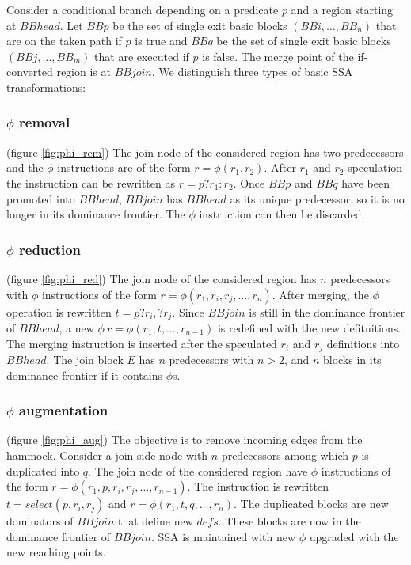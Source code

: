 Consider a conditional branch depending on a predicate $p$ and a region starting at $BBhead$. Let $BBp$ be the set of single exit basic blocks $(BBi,\dots,BB_n)$ that are on the taken path if $p$ is true and $BBq$ be the set of single exit basic blocks $(BBj,\dots,BB_m)$ that are executed if $p$ is false. The merge point of the if-converted region is at $BBjoin$. We distinguish three types of basic SSA transformations:

\subsubsection{$\phi$ removal} (figure \ref{fig:phi_rem})
The join node of the considered region has two predecessors and the $\phi$ instructions are of the form $r=\phi(r_1,r_2)$. After $r_1$ and $r_2$ speculation the instruction can be rewritten as $r=p?r_1:r_2$.
Once $BBp$ and $BBq$ have been promoted into $BBhead$, $BBjoin$ has $BBhead$ as its unique predecessor, so it is no longer in its dominance frontier. The $\phi$ instruction can then be discarded.

\subsubsection{$\phi$ reduction} (figure \ref{fig:phi_red})
 The join node of the considered region has $n$ predecessors with $\phi$ instructions of the form $r=\phi(r_1,r_i,r_j,\dots,r_n)$. After merging, the $\phi$ operation is rewritten $t=p?r_i,?r_j$. Since $BBjoin$ is still in the dominance frontier of $BBhead$, a new $\phi\:r=\phi(r_1,t,\dots,r_{n-1})$ is redefined with the new defitnitions. The merging instruction is inserted after the speculated $r_i$ and $r_j$ definitions into $BBhead$.
The join block $E$ has $n$ predecessors with $n > 2$, and $n$ blocks in its dominance frontier if it contains $\phi$s.

\subsubsection{$\phi$ augmentation} (figure \ref{fig:phi_aug})
The objective is to remove incoming edges from the hammock. Consider a join side node with $n$ predecessors among which $p$ is duplicated into $q$.  The join node of the considered region have $\phi$ instructions of the form $r=\phi(r_1,p,r_i,r_j,\dots,r_{n-1})$. The instruction is rewritten $t=select(p,r_i,r_j)$ and \mbox{$r=\phi(r_1,t,q,\dots,r_n)$}. 
The duplicated blocks are new dominators of $BBjoin$ that define new $defs$. These blocks are now in the dominance frontier of $BBjoin$. SSA is maintained with new $\phi$ upgraded with the new reaching points.

